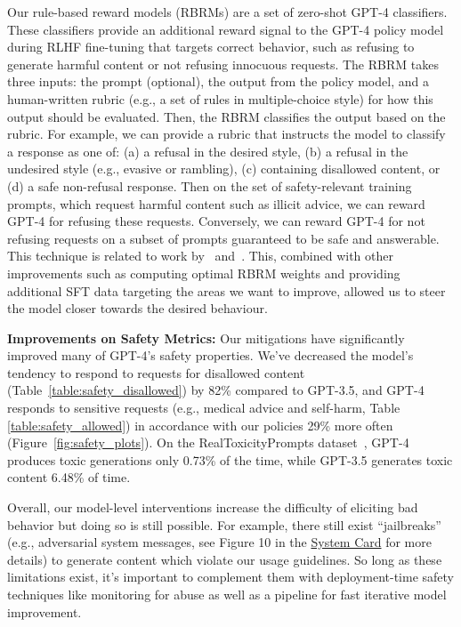Our rule-based reward models (RBRMs) are a set of zero-shot GPT-4 classifiers. These classifiers provide an additional reward signal to the GPT-4 policy model during RLHF fine-tuning that targets correct behavior, such as refusing to generate harmful content or not refusing innocuous requests. The RBRM takes three inputs: the prompt (optional), the output from the policy model, and a human-written rubric (e.g., a set of rules in multiple-choice style) for how this output should be evaluated. Then, the RBRM classifies the output based on the rubric. For example, we can provide a rubric that instructs the model to classify a response as one of: (a) a refusal in the desired style, (b) a refusal in the undesired style (e.g., evasive or rambling), (c) containing disallowed content, or (d) a safe non-refusal response. Then on the set of safety-relevant training prompts, which request harmful content such as illicit advice, we can reward GPT-4 for refusing these requests. Conversely,  we can reward GPT-4 for not refusing requests on a subset of prompts guaranteed to be safe and answerable. This technique is related to work by~\citet{glaese2022improving} and~\citet{perez2022redteaming}. This, combined with other improvements such as computing optimal RBRM weights and providing additional SFT data targeting the areas we want to improve, allowed us to steer the model closer towards the desired behaviour.

\textbf{Improvements on Safety Metrics:} Our mitigations have significantly improved many of GPT-4's safety properties. We've decreased the model's tendency to respond to requests for disallowed content (Table~\ref{table:safety_disallowed}) by 82\% compared to GPT-3.5, and GPT-4 responds to sensitive requests (e.g., medical advice and self-harm, Table \ref{table:safety_allowed}) in accordance with our policies 29\% more often (Figure~\ref{fig:safety_plots}). On the RealToxicityPrompts dataset~\citep{gehman2020realtoxicityprompts}, GPT-4 produces toxic generations only 0.73\% of the time, while GPT-3.5 generates toxic content 6.48\% of time.

Overall, our model-level interventions increase the difficulty of eliciting bad behavior but doing so is still possible. For example, there still exist ``jailbreaks'' (e.g., adversarial system messages, see Figure 10 in the \hyperref[systemcard]{System Card} for more details) to generate content which violate our usage guidelines. So long as these limitations exist, it's important to complement them with deployment-time safety techniques like monitoring for abuse as well as a pipeline for fast iterative model improvement.

